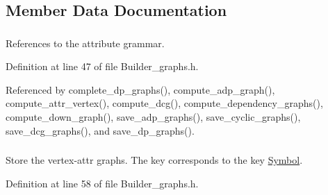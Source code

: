\subsection{Member Data Documentation}
\hypertarget{classgenevalmag_1_1Builder__graphs_a10e4acb76015aeea26cf61980a3c6e33}{
\subsubsection[{attr\_\-grammar}]{}}
\label{classgenevalmag_1_1Builder__graphs_a10e4acb76015aeea26cf61980a3c6e33}


References to the attribute grammar. 



Definition at line 47 of file Builder\_\-graphs.h.



Referenced by complete\_\-dp\_\-graphs(), compute\_\-adp\_\-graph(), compute\_\-attr\_\-vertex(), compute\_\-dcg(), compute\_\-dependency\_\-graphs(), compute\_\-down\_\-graph(), save\_\-adp\_\-graphs(), save\_\-cyclic\_\-graphs(), save\_\-dcg\_\-graphs(), and save\_\-dp\_\-graphs().

\hypertarget{classgenevalmag_1_1Builder__graphs_ae5a3713f467704d2e3dc67da86ded862}{
\subsubsection[{attr\_\-vertex\_\-graphs}]{}}
\label{classgenevalmag_1_1Builder__graphs_ae5a3713f467704d2e3dc67da86ded862}


Store the vertex-\/attr graphs. The key corresponds to the key \hyperlink{classgenevalmag_1_1Symbol}{Symbol}. 



Definition at line 58 of file Builder\_\-graphs.h.



